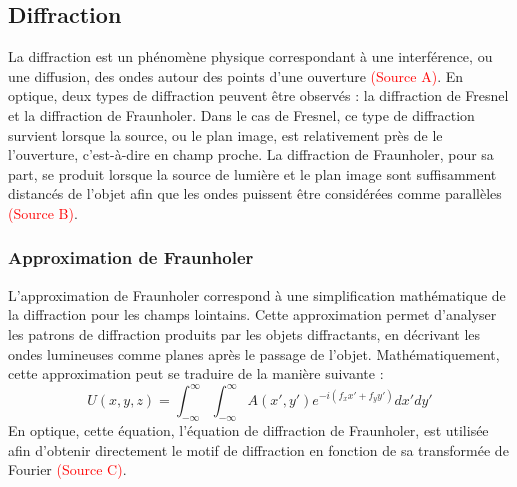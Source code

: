 \documentclass[11pt,letterpaper]{article}
\begin{document}

\subsection{Diffraction}
La diffraction est un phénomène physique correspondant à une interférence, ou une diffusion, des ondes autour des points d'une ouverture \textcolor{red}{(Source A)}. En optique, deux types de diffraction peuvent être observés : la diffraction de Fresnel et la diffraction de Fraunholer. Dans le cas de Fresnel, ce type de diffraction survient lorsque la source, ou le plan image, est relativement près de le l'ouverture, c'est-à-dire en champ proche. La diffraction de Fraunholer, pour sa part, se produit lorsque la source de lumière et le plan image sont suffisamment distancés de l'objet afin que les ondes puissent être considérées comme parallèles \textcolor{red}{(Source B)}.


\subsubsection{Approximation de Fraunholer}
L'approximation de Fraunholer correspond à une simplification mathématique de la diffraction pour les champs lointains. Cette approximation permet d'analyser les patrons de diffraction produits par les objets diffractants, en décrivant les ondes lumineuses comme planes après le passage de l'objet. Mathématiquement, cette approximation peut se traduire de la manière suivante :
\begin{equation}
  U(x,y,z)=\int_{-\infty}^{\infty}\int_{-\infty}^{\infty}A(x',y')e^{-i(f_{x}x'+f_{y}y')}dx'dy'
\end{equation}
En optique, cette équation, l'équation de diffraction de Fraunholer, est utilisée afin d'obtenir directement le motif de diffraction en fonction de sa transformée de Fourier \textcolor{red}{(Source C)}. 

\end{document}
